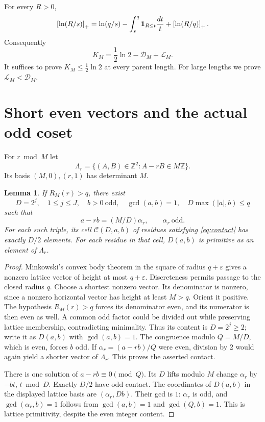 \documentclass[11pt,a4paper]{article}
\numberwithin{equation}{section}
\newtheorem{lemma}[theorem]{Lemma}
\theoremstyle{remark}
\newcommand{\Z}{\mathbb Z}
\newcommand{\pos}[1]{\left[#1\right]_+}
\newcommand{\odd}{\mathrm{odd}}
\begin{document}
For every $R>0$,
\[
 \pos{\ln(R/s)}
 =\ln(q/s)-\int_s^q {\bf1}_{R\le t}\frac{dt}{t}
             +\pos{\ln(R/q)}.
\]
Consequently
\begin{equation}\label{eq:identity}
 K_M=\frac12\ln2-\mathcal D_M+\mathcal L_M.
\end{equation}
It suffices to prove $K_M\le\frac12\ln2$ at every parent length.
For large lengths we prove $\mathcal L_M<\mathcal D_M$.

\section{Short even vectors and the actual odd coset}\label{sec:cusps}
For $r\bmod M$ let
\[
 \Lambda_r=\{(A,B)\in\Z^2:A-rB\in M\Z\}.
\]
Its basis $(M,0),(r,1)$ has determinant $M$.

\begin{lemma}\label{lem:certificate}
If $R_M(r)>q$, there exist
\[
 D=2^j,\quad1\le j\le J,\quad b>0\ \odd,\quad
 \gcd(a,b)=1,\quad D\max(|a|,b)\le q
\]
such that
\begin{equation}\label{eq:contact}
           a-rb=(M/D)\alpha_r,\qquad \alpha_r\ \odd.
\end{equation}
For each such triple, its cell $\mathcal C(D,a,b)$ of residues satisfying
\eqref{eq:contact} has exactly $D/2$ elements.
For each residue in that cell, $D(a,b)$ is primitive as an element of
$\Lambda_r$.
\end{lemma}
\begin{proof}
Minkowski's convex body theorem \cite{Cassels} in the square of radius
$q+\varepsilon$ gives a nonzero lattice vector of height at most
$q+\varepsilon$. Discreteness permits passage to the closed radius $q$.
Choose a shortest nonzero vector. Its denominator is nonzero, since a
nonzero horizontal vector has height at least $M>q$.
Orient it positive. The hypothesis $R_M(r)>q$ forces its denominator
even, and its numerator is then even as well.
A common odd factor could be divided out while preserving lattice
membership, contradicting minimality. Thus its content is $D=2^j\ge2$;
write it as $D(a,b)$ with $\gcd(a,b)=1$.
The congruence modulo $Q=M/D$, which is even, forces $b$ odd.
If $\alpha_r=(a-rb)/Q$ were even, division by $2$ would again yield
a shorter vector of $\Lambda_r$. This proves the asserted contact.

There is one solution of $a-rb\equiv0\pmod Q$. Its $D$ lifts modulo $M$
change $\alpha_r$ by $-bt$, $t\bmod D$. Exactly $D/2$ have odd contact.
The coordinates of $D(a,b)$ in the displayed lattice basis are
$(\alpha_r,Db)$. Their gcd is $1$: $\alpha_r$ is odd, and
$\gcd(\alpha_r,b)=1$ follows from $\gcd(a,b)=1$ and $\gcd(Q,b)=1$.
This is lattice primitivity, despite the even integer content.
\end{proof}
\end{document}
